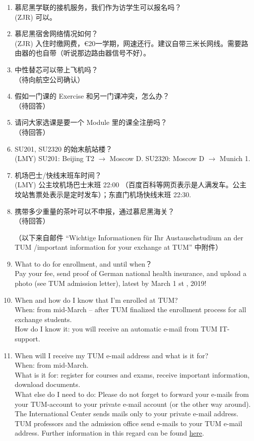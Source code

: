 \begin{enumerate}
  (ZJR) 可以。也可以电子签名。(LMY) 请按要求发送 .pdf 格式文件。
  \item 慕尼黑学联的接机服务，我们作为访学生可以报名吗？ \\
  (ZJR) 可以。
  \item 慕尼黑宿舍网络情况如何？ \\
  (ZJR) 入住时缴网费，\euro{20}一学期，网速还行。建议自带三米长网线。需要路由器的也自带（听说那边路由器信号不好）。
  \item 中性替芯可以带上飞机吗？ \\
  （待向航空公司确认）
  \item 假如一门课的 Exercise 和另一门课冲突，怎么办？ \\
  （待回答）
  \item 请问大家选课是要一个 Module 里的课全注册吗？ \\
  （待回答）
  \item SU201, SU2320 的始末航站楼？ \\
  (LMY) SU201: Beijing T2 $\rightarrow$ Moscow D. SU2320: Moscow D $\rightarrow$ Munich 1.
  \item 机场巴士/快线末班车时间？ \\
  (LMY) 公主坟机场巴士末班 22:00 （百度百科等网页表示是人满发车。公主坟站售票处表示是定时发车）；东直门机场快线末班 22:30.
  \item 携带多少重量的茶叶可以不申报，通过慕尼黑海关？ \\
  （待回答）

\noindent
（以下来自邮件 ``Wichtige Informationen für Ihr Austauschstudium an der TUM /important information for your exchange at TUM'' 中附件）
  \item What to do for enrollment, and until when？ \\
  Pay your fee, send proof of German national health insurance, and upload a photo
  (see TUM admission letter), latest by March 1 st , 2019!
  \item When and how do I know that I’m enrolled at TUM? \\
  When: from mid-March – after TUM finalized the enrollment process for all exchange students. \\
  How do I know it: you will receive an automatic e-mail from TUM IT-support.
  \item When will I receive my TUM e-mail address and what is it for? \\
  When: from mid-March. \\
  What is it for: register for courses and exams, receive important information, download documents. \\
  What else do I need to do: Please do not forget to forward your e-mails from your TUM-account to your
  private e-mail account (or the other way around). The International Center sends mails only to your private
  e-mail address. TUM professors and the admission office send e-mails to your TUM e-mail address. Further
  information in this regard can be found \href{http://www.it.tum.de/en/faq/it-services/e-mail/}{here}.
\end{enumerate}

